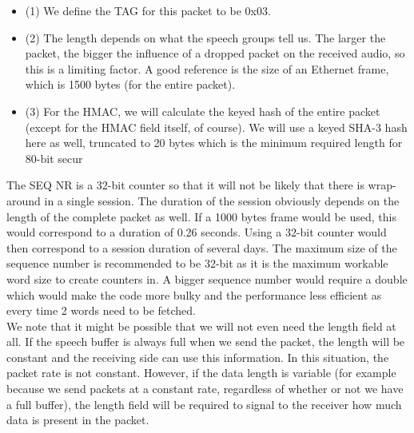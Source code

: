 \documentclass[a4paper]{article}
\begin{document}
\begin{itemize}
    \item (1) We define the TAG for this packet to be 0x03.
    \item (2) The length depends on what the speech groups tell us. The larger the packet, the bigger the influence of a dropped packet on the received audio, so this is a limiting factor. A good reference is the size of an Ethernet frame, which is 1500 bytes (for the entire packet).
    \item (3) For the HMAC, we will calculate the keyed hash of the entire packet (except for the HMAC field itself, of course). We will use a keyed SHA-3 hash here as well, truncated to 20 bytes which is the minimum required length for 80-bit secur
\end{itemize}

The SEQ NR is a 32-bit counter so that it will not be likely that there is wrap-around in a single session. The duration of the session obviously depends on the length of the complete packet as well. If a 1000 bytes frame would be used, this would correspond to a duration of 0.26 seconds. Using a 32-bit counter would then correspond to a session duration of several days. The maximum size of the sequence number is recommended to be 32-bit as it is the maximum workable word size to create counters in. A bigger sequence number would require a double which would make the code more bulky and the performance less efficient as every time 2 words need to be fetched.\\

We note that it might be possible that we will not even need the length field at all. If the speech buffer is always full when we send the packet, the length will be constant and the receiving side can use this information. In this situation, the packet rate is not constant. However, if the data length is variable (for example because we send packets at a constant rate, regardless of whether or not we have a full buffer), the length field will be required to signal to the receiver how much data is present in the packet.
\end{document}
